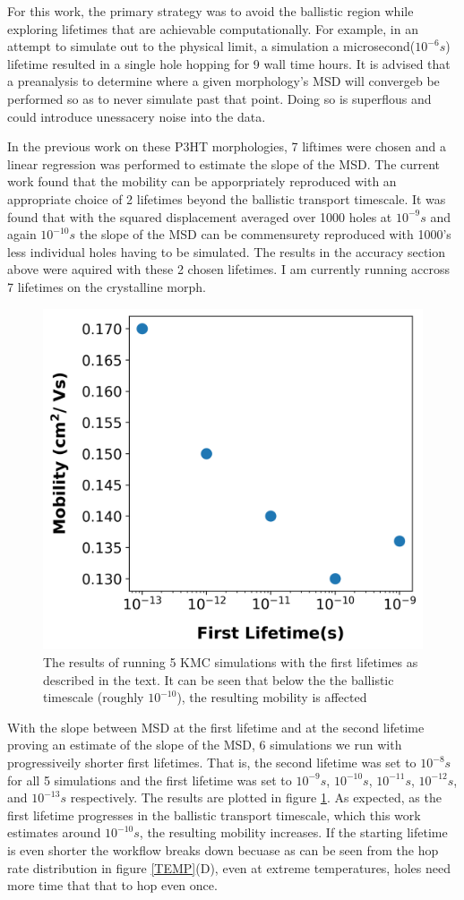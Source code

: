 For this work, the primary strategy was to avoid the ballistic region while exploring lifetimes
that are achievable computationally. For example, in an attempt to simulate out to the physical limit, a
simulation a microsecond($10^{-6}s$) lifetime resulted in a single hole hopping for 9 wall time hours.
It is advised that a preanalysis to determine where a given morphology's MSD will convergeb be performed so as
to never simulate past that point. Doing so is superflous and could introduce unessacery noise into the data. 

In the previous work on these P3HT morphologies, 7 liftimes were chosen and a linear regression was performed
to estimate the slope of the MSD. The current work found that the mobility can be apporpriately reproduced
with an appropriate choice of 2 lifetimes beyond the ballistic transport timescale. It was found that with the 
squared displacement averaged over 1000 holes at $10^{-9}s$ and again $10^{-10}s$ the slope of the MSD can be
commensurety reproduced with 1000's less individual holes having to be simulated. The results in the accuracy
section above were aquired with these 2 chosen lifetimes. I am currently running accross 7 lifetimes on the
crystalline morph. 

\begin{figure}
  \center
  \includegraphics[width=0.6\linewidth]{figures/lifetime.png} 
    \caption{The results of running 5 KMC simulations with the first lifetimes as described in the text. It
    can be seen that below the the ballistic timescale (roughly $10^{-10}$), the resulting mobility is affected}
  \label{lifetime}
\end{figure}

With the slope between MSD at the first lifetime and at the second lifetime proving an estimate of the slope
of the MSD, 6 simulations we run with progressiveily shorter first lifetimes. That is, the second lifetime was
set to $10^{-8}s$ for all 5 simulations and the first lifetime was set to $10^{-9}s$, $10^{-10}s$,
$10^{-11}s$, $10^{-12}s$, and $10^{-13}s$ respectively. The results are plotted in figure
\ref{lifetime}. As expected, as the first lifetime progresses in the ballistic transport timescale, which this work
estimates around $10^{-10}s$, the resulting mobility increases. If the starting lifetime is even shorter the
workflow breaks down becuase as can be seen from the hop rate distribution in figure \ref{TEMP}(D), even at
extreme temperatures, holes need more time that that to hop even once. 


